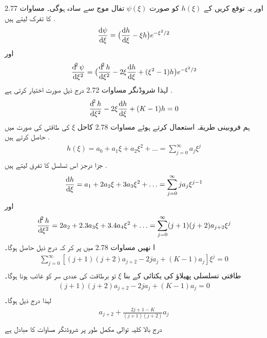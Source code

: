 \documentclass{book}
\begin{document}
اور یہ توقع کریں کے
\(h(\xi)\)
کو صورت
\(\psi(\xi)\)
تفال موج سے سادہ ہوگی۔ مساوات 2.77 کا تفرک لیتے ہیں .
\begin{align*}
\frac{\dif{\psi}}{\dif{\xi}}=\big(\frac{\dif{h}}{\dif{\xi}}-\xi h\big )e^{-\xi^{2}/2}\\
\end{align*}
اور
\begin{align*}
\frac{\dif^{2}{\psi}}{\dif{\xi^{2}}}=\big (\frac{\dif^{2}{h}}{\dif{\xi^{2}}}-2\xi\frac{\dif{h}}{\dif{\xi}}+(\xi^{2}-1)h\big )e^{-\xi^{2}/2}\\
\end{align*}
لہذا شروڈنگر مساوات 2.72 درج ذیل صورت اختیار کرتی ہے .
\begin{align*}
\frac{\dif^{2}{h}}{\dif{\xi^{2}}}-2\xi\frac{\dif{h}}{\dif{\xi}}+(K-1)h=0\\
\end{align*}
ہم فروبینی طریقہ استعمال کرتے ہوئے مساوات 2.78 کاحل
\(\xi\)
کی طاقتی کی صورت میں حاصل کرتے ہیں .
\begin{align*}
h(\xi)=a_{0}+a_{1}\xi+a_{2}\xi^{2}+\dotsc = \sum_{j=0}^{\infty}a_{j}\xi^{j}\\
\end{align*}
جزا درجز اس تسلسل کا تفرق لیتے ہیں .
\begin{align*}
\frac{\dif{h}}{\dif{\xi}}=a_{1}+2a_{2}\xi+3a_{3}\xi^{2}+\dotsc =\sum_{j=0}^{\infty}ja_{j}\xi^{j-1}\\
\end{align*}
اور
\begin{align*}
\frac{\dif^{2}{h}}{\dif{\xi^{2}}}=2a_{2}+2.3a_{3}\xi+3.4a_{4}\xi^{2}+\dotsc =\sum_{j=0}^{\infty}(j+1)(j+2)a_{j+2}\xi^{j}\\
\end{align*}
ا نھیں مساوات 2.78 میں پر کر کہ درج ذیل حاصل ہوگا۔
\begin{align*}
\sum_{j=0}^{\infty}[(j+1)(j+2)a_{j+2}-2ja_{j}+(K-1)a_{j}]\xi^{j}=0\\
\end{align*}
طاقتی تسلسلی پھیلاؤ کی یکتائی کے بنا
\(\xi\)
تو برطاقت کی عددی سر کو غائب ہونا ہوگا۔
\begin{align*}
(j+1)(j+2)a_{j+2}-2ja_{j}+(K-1)a_{j}=0\\
\end{align*}
لہذا درج ذیل ہوگا۔
\begin{align*}
a_{j+2}+\frac{2j+1-K}{(j+1)(j+2)}a_{j}\\
\end{align*}
درج بالا کلیہ توالی مکمل طور پر شروڈنگر مساوات کا مبادل ہے
\end{document}
